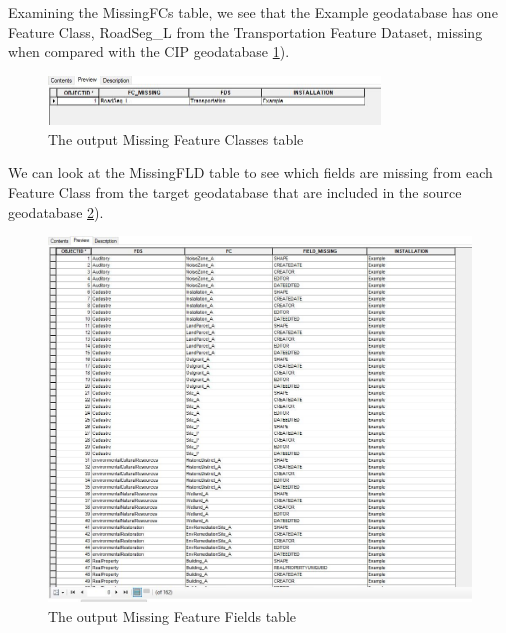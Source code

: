 \documentclass[openany]{book}
\theoremstyle{definition}
\theoremstyle{definition}
\theoremstyle{definition}
\theoremstyle{remark}
\begin{document}
Examining the MissingFCs table, we see that the Example geodatabase has
one Feature Class, RoadSeg\_L from the Transportation Feature Dataset,
missing when compared with the CIP geodatabase
\ref{fig:indtSearchmissingFCs}).

\begin{figure}[H]

{\centering \includegraphics[width=3.47in,]{figures/indtSearch-missingFCs} 

}

\caption{The output Missing Feature Classes table}\label{fig:indtSearchmissingFCs}
\end{figure}

We can look at the MissingFLD table to see which fields are missing from
each Feature Class from the target geodatabase that are included in the
source geodatabase \ref{fig:indtSearchmissingFLDs}).

\begin{figure}[H]

{\centering \includegraphics[width=5.26in,]{figures/indtSearch-missingFLDs} 

}

\caption{The output Missing Feature Fields table}\label{fig:indtSearchmissingFLDs}
\end{figure}
\end{document}
